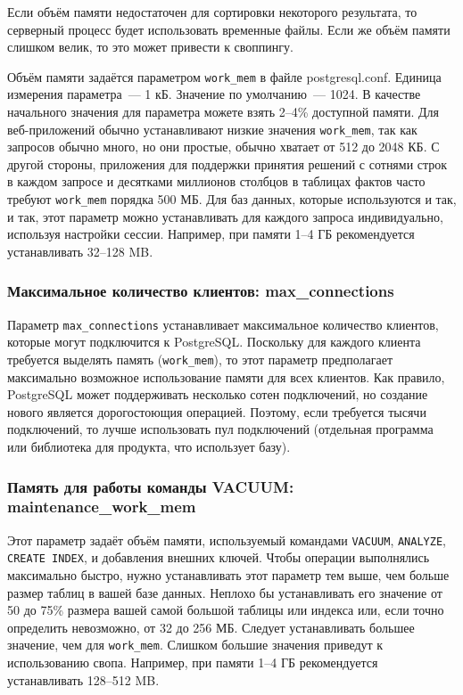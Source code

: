 Если объём памяти недостаточен для сортировки некоторого результата, то серверный процесс будет использовать временные файлы. Если же объём памяти слишком велик, то это может привести к своппингу.

Объём памяти задаётся параметром \lstinline!work_mem! в файле postgresql.conf. Единица измерения параметра~--- 1 кБ. Значение по умолчанию~--- 1024. В качестве начального значения для параметра можете взять 2--4\% доступной памяти. Для веб-приложений обычно устанавливают низкие значения \lstinline!work_mem!, так как запросов обычно много, но они простые, обычно хватает от 512 до 2048 КБ. С другой стороны, приложения для поддержки принятия решений с сотнями строк в каждом запросе и десятками миллионов столбцов в таблицах фактов часто требуют \lstinline!work_mem! порядка 500 МБ. Для баз данных, которые используются и так, и так, этот параметр можно устанавливать для каждого запроса индивидуально, используя настройки сессии. Например, при памяти 1--4 ГБ рекомендуется устанавливать 32--128 MB.


\subsubsection{Максимальное количество клиентов: max\_connections}


Параметр \lstinline!max_connections! устанавливает максимальное количество клиентов, которые могут подключится к PostgreSQL. Поскольку для каждого клиента требуется выделять память (\lstinline!work_mem!), то этот параметр предполагает максимально возможное использование памяти для всех клиентов. Как правило, PostgreSQL может поддерживать несколько сотен подключений, но создание нового является дорогостоющия операцией. Поэтому, если требуется тысячи подключений, то лучше использовать пул подключений (отдельная программа или библиотека для продукта, что использует базу).


\subsubsection{Память для работы команды VACUUM: maintenance\_work\_mem}


Этот параметр задаёт объём памяти, используемый командами \lstinline!VACUUM!, \lstinline!ANALYZE!, \lstinline!CREATE INDEX!, и добавления внешних ключей. Чтобы операции выполнялись максимально быстро, нужно устанавливать этот параметр тем выше, чем больше размер таблиц в вашей базе данных. Неплохо бы устанавливать его значение от 50 до 75\% размера вашей самой большой таблицы или индекса или, если точно определить невозможно, от 32 до 256 МБ. Следует устанавливать большее значение, чем для \lstinline!work_mem!. Слишком большие значения приведут к использованию свопа. Например, при памяти 1--4 ГБ рекомендуется устанавливать 128--512 MB.


